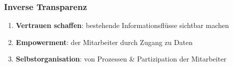 \documentclass{article}
\begin{document}
\subsubsection{Inverse Transparenz}
\begin{enumerate}
  \item \textbf{Vertrauen schaffen}: bestehende Informationsflüsse sichtbar machen
  \item \textbf{Empowerment}: der Mitarbeiter durch Zugang zu Daten
  \item \textbf{Selbstorganisation}: von Prozessen \& Partizipation der Mitarbeiter
\end{enumerate}
\end{document}
